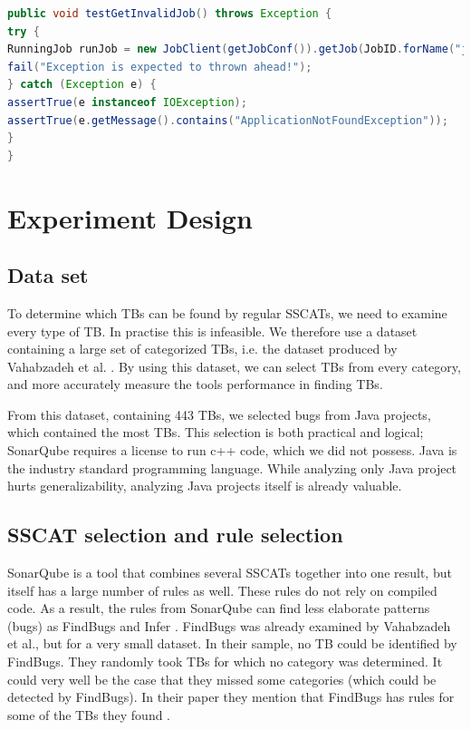 \documentclass{uvamscse}
\newcommand{\Atestbugs}{Vahabzadeh et al.}
\begin{document}
\begin{lstlisting}[language=java, label=Code_TB_Obsolete_Fix, caption=Fix for obsolete TB]
public void testGetInvalidJob() throws Exception {
try {
RunningJob runJob = new JobClient(getJobConf()).getJob(JobID.forName("job_0_0"));
fail("Exception is expected to thrown ahead!");
} catch (Exception e) {
assertTrue(e instanceof IOException);
assertTrue(e.getMessage().contains("ApplicationNotFoundException"));
}
}
\end{lstlisting}

\section{Experiment Design}

\subsection{Data set}
To determine which TBs can be found by regular SSCATs, we need to examine every type of TB. In practise this is infeasible. We therefore use a dataset containing a large set of categorized TBs, i.e. the dataset produced by \Atestbugs{} \cite{data}. By using this dataset, we can select TBs from every category, and more accurately measure the tools performance in finding TBs.

From this dataset, containing 443 TBs, we selected bugs from Java projects, which contained the most TBs. This selection is both practical and logical; SonarQube requires a license to run c++ code, which we did not possess. Java is the industry standard programming language. While analyzing only Java project hurts generalizability, analyzing Java projects itself is already valuable. 

\subsection{SSCAT selection and rule selection}
SonarQube is a tool that combines several SSCATs together into one result, but itself has a large number of rules as well. These rules do not rely on compiled code. As a result, the rules from SonarQube can find less elaborate patterns (bugs) as FindBugs and Infer . FindBugs was already examined by \Atestbugs{}, but for a very small dataset. In their sample, no TB could be identified by FindBugs. They  randomly took TBs for which no category was determined. It could very well be the case that they missed some categories (which could be detected by FindBugs). In their paper they mention that FindBugs has rules for some of the TBs they found \cite{vahabzadeh2015empirical}. 
\end{document}
